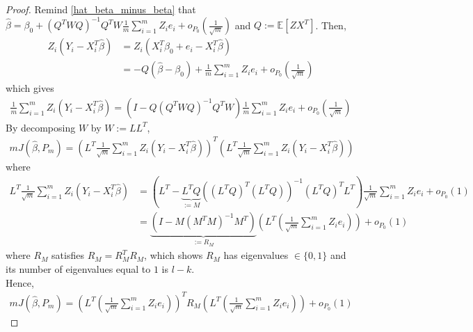 \documentclass[11pt]{elegantbook}
\begin{document}
\begin{proof}
    Remind \eqref{hat_beta_minus_beta} that $\hat{\beta}=\beta_0+(Q^TWQ)^{-1}Q^TW\frac{1}{m}\sum_{i=1}^mZ_ie_i+o_{P_0}(\frac{1}{\sqrt{m}})$ and $Q:=\mathbb{E}[ZX^T]$. Then,
    \begin{equation}
        \begin{aligned}
            Z_i(Y_i-X_i^T\hat{\beta})&=Z_i(X_i^T\beta_0+e_i-X_i^T\hat{\beta})\\
            &=-Q(\hat{\beta}-\beta_0)+\frac{1}{m}\sum_{i=1}^mZ_ie_i+o_{P_0}(\frac{1}{\sqrt{m}})
        \end{aligned}
        \nonumber
    \end{equation}
    which gives
    \begin{equation}
        \begin{aligned}
            \frac{1}{m}\sum_{i=1}^mZ_i(Y_i-X_i^T\hat{\beta})=\left(I-Q(Q^TWQ)^{-1}Q^TW\right)\frac{1}{m}\sum_{i=1}^mZ_ie_i+o_{P_0}(\frac{1}{\sqrt{m}})
        \end{aligned}
        \nonumber
    \end{equation}
    By decomposing $W$ by $W:=LL^T$,
    \begin{equation}
        \begin{aligned}
            m J(\hat{\beta},P_m)=\left(L^T\frac{1}{\sqrt{m}}\sum_{i=1}^mZ_i(Y_i-X_i^T\hat{\beta})\right)^T\left(L^T\frac{1}{\sqrt{m}}\sum_{i=1}^mZ_i(Y_i-X_i^T\hat{\beta})\right)
        \end{aligned}
        \nonumber
    \end{equation}
    where
    \begin{equation}
        \begin{aligned}
            L^T\frac{1}{\sqrt{m}}\sum_{i=1}^mZ_i(Y_i-X_i^T\hat{\beta})&=\left(L^T-\underbrace{L^TQ}_{:=M}((L^TQ)^T(L^TQ))^{-1}(L^TQ)^TL^T\right)\frac{1}{\sqrt{m}}\sum_{i=1}^mZ_ie_i+o_{P_0}(1)\\
            &=\underbrace{\left(I-M(M^TM)^{-1}M^T\right)}_{:=R_M}\left(L^T\left(\frac{1}{\sqrt{m}}\sum_{i=1}^mZ_ie_i\right)\right)+o_{P_0}(1)
        \end{aligned}
        \nonumber
    \end{equation}
    where $R_M$ satisfies $R_M=R_M^TR_M$, which shows $R_M$ has eigenvalues $\in\{0,1\}$ and its number of eigenvalues equal to $1$ is $l-k$.\\
    Hence,
    \begin{equation}
        \begin{aligned}
            m J(\hat{\beta},P_m)=\left(L^T\left(\frac{1}{\sqrt{m}}\sum_{i=1}^mZ_ie_i\right)\right)^TR_M\left(L^T\left(\frac{1}{\sqrt{m}}\sum_{i=1}^mZ_ie_i\right)\right)+o_{P_0}(1)

\end{aligned}
\end{equation}
\end{proof}
\end{document}
